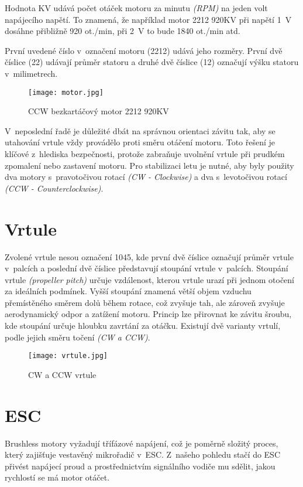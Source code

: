 \documentclass[12pt]{report}
\begin{document}
Hodnota KV udává počet otáček motoru za minutu \textit{(RPM)} na jeden volt napájecího napětí. To znamená, že například motor 2212 920KV při napětí 1~V dosáhne přibližně 920 ot./min, při 2~V to bude 1840 ot./min atd.

První uvedené číslo v~označení motoru (2212) udává jeho rozměry. První dvě číslice (22) udávají průměr statoru a druhé dvě číslice (12) označují výšku statoru v~milimetrech.

\begin{figure}[H]
	\centering
	\texttt{[image: motor.jpg]}
	\caption{CCW bezkartáčový motor 2212 920KV}
	\label{fig:motor.jpg}
\end{figure}

V~neposlední řadě je důležité dbát na správnou orientaci závitu tak, aby se utahování vrtule vždy provádělo proti směru otáčení motoru. Toto řešení je klíčové z~hlediska bezpečnosti, protože zabraňuje uvolnění vrtule při prudkém zpomalení nebo zastavení motoru. Pro stabilizaci letu je nutné, aby byly použity dva motory s~pravotočivou rotací \textit{(CW - Clockwise)} a dva s~levotočivou rotací \textit{(CCW - Counterclockwise)}. \cite{ol}

\section[Vrtule]{Vrtule}
Zvolené vrtule nesou označení 1045, kde první dvě číslice označují průměr vrtule v~palcích a poslední dvě číslice představují stoupání vrtule v~palcích. Stoupání vrtule \textit{(propeller pitch)} určuje vzdálenost, kterou vrtule urazí při jednom otočení za ideálních podmínek. Vyšší stoupání znamená větší objem vzduchu přemístěného směrem dolů během rotace, což zvyšuje tah, ale zároveň zvyšuje aerodynamický odpor a zatížení motoru. Princip lze přirovnat ke závitu šroubu, kde stoupání určuje hloubku zavrtání za otáčku. Existují dvě varianty vrtulí, podle jejich směru točení \textit{(CW a CCW)}.

\begin{figure}[H]
	\centering
	\texttt{[image: vrtule.jpg]}
	\caption{CW a CCW vrtule}
	\label{fig:motor.jpg}
\end{figure}

\section[ESC]{ESC}
Brushless motory vyžadují třífázové napájení, což je poměrně složitý proces, který zajišťuje vestavěný mikrořadič v~ESC. Z~našeho pohledu stačí do ESC přivést napájecí proud a prostřednictvím signálního vodiče mu sdělit, jakou rychlostí se má motor otáčet.
\end{document}
